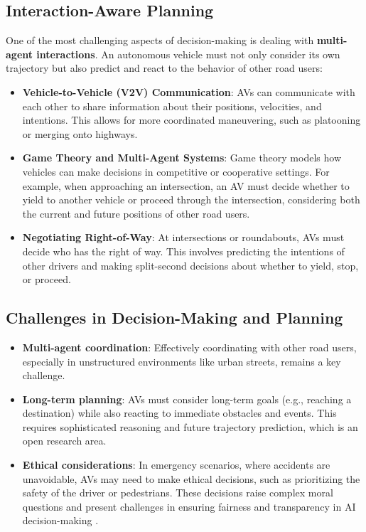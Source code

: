 \documentclass[12pt,a4paper]{article}
\begin{document}
\subsection{Interaction-Aware Planning}
One of the most challenging aspects of decision-making is dealing with \textbf{multi-agent interactions}. An autonomous vehicle must not only consider its own trajectory but also predict and react to the behavior of other road users:
\begin{itemize}
    \item \textbf{Vehicle-to-Vehicle (V2V) Communication}: AVs can communicate with each other to share information about their positions, velocities, and intentions. This allows for more coordinated maneuvering, such as platooning or merging onto highways.
    \item \textbf{Game Theory and Multi-Agent Systems}: Game theory models how vehicles can make decisions in competitive or cooperative settings. For example, when approaching an intersection, an AV must decide whether to yield to another vehicle or proceed through the intersection, considering both the current and future positions of other road users.
    \item \textbf{Negotiating Right-of-Way}: At intersections or roundabouts, AVs must decide who has the right of way. This involves predicting the intentions of other drivers and making split-second decisions about whether to yield, stop, or proceed.
\end{itemize}

\subsection{Challenges in Decision-Making and Planning}
\begin{itemize}
    \item \textbf{Multi-agent coordination}: Effectively coordinating with other road users, especially in unstructured environments like urban streets, remains a key challenge.
    \item \textbf{Long-term planning}: AVs must consider long-term goals (e.g., reaching a destination) while also reacting to immediate obstacles and events. This requires sophisticated reasoning and future trajectory prediction, which is an open research area.
    \item \textbf{Ethical considerations}: In emergency scenarios, where accidents are unavoidable, AVs may need to make ethical decisions, such as prioritizing the safety of the driver or pedestrians. These decisions raise complex moral questions and present challenges in ensuring fairness and transparency in AI decision-making \cite{maccarthy2024autonomous}.
\end{itemize}
\end{document}
